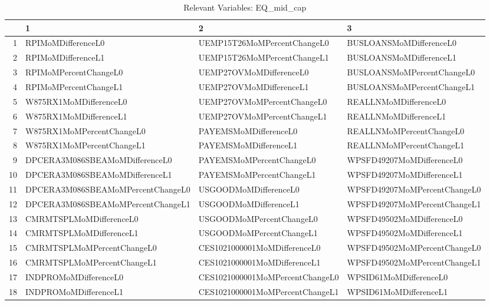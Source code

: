 \begin{longtable}{rlll}
\caption{Relevant Variables: EQ_mid_cap} \\ 
  \hline
 & 1 & 2 & 3 \\ 
  \hline
1 & RPIMoMDifferenceL0 & UEMP15T26MoMPercentChangeL0 & BUSLOANSMoMDifferenceL0 \\ 
  2 & RPIMoMDifferenceL1 & UEMP15T26MoMPercentChangeL1 & BUSLOANSMoMDifferenceL1 \\ 
  3 & RPIMoMPercentChangeL0 & UEMP27OVMoMDifferenceL0 & BUSLOANSMoMPercentChangeL0 \\ 
  4 & RPIMoMPercentChangeL1 & UEMP27OVMoMDifferenceL1 & BUSLOANSMoMPercentChangeL1 \\ 
  5 & W875RX1MoMDifferenceL0 & UEMP27OVMoMPercentChangeL0 & REALLNMoMDifferenceL0 \\ 
  6 & W875RX1MoMDifferenceL1 & UEMP27OVMoMPercentChangeL1 & REALLNMoMDifferenceL1 \\ 
  7 & W875RX1MoMPercentChangeL0 & PAYEMSMoMDifferenceL0 & REALLNMoMPercentChangeL0 \\ 
  8 & W875RX1MoMPercentChangeL1 & PAYEMSMoMDifferenceL1 & REALLNMoMPercentChangeL1 \\ 
  9 & DPCERA3M086SBEAMoMDifferenceL0 & PAYEMSMoMPercentChangeL0 & WPSFD49207MoMDifferenceL0 \\ 
  10 & DPCERA3M086SBEAMoMDifferenceL1 & PAYEMSMoMPercentChangeL1 & WPSFD49207MoMDifferenceL1 \\ 
  11 & DPCERA3M086SBEAMoMPercentChangeL0 & USGOODMoMDifferenceL0 & WPSFD49207MoMPercentChangeL0 \\ 
  12 & DPCERA3M086SBEAMoMPercentChangeL1 & USGOODMoMDifferenceL1 & WPSFD49207MoMPercentChangeL1 \\ 
  13 & CMRMTSPLMoMDifferenceL0 & USGOODMoMPercentChangeL0 & WPSFD49502MoMDifferenceL0 \\ 
  14 & CMRMTSPLMoMDifferenceL1 & USGOODMoMPercentChangeL1 & WPSFD49502MoMDifferenceL1 \\ 
  15 & CMRMTSPLMoMPercentChangeL0 & CES1021000001MoMDifferenceL0 & WPSFD49502MoMPercentChangeL0 \\ 
  16 & CMRMTSPLMoMPercentChangeL1 & CES1021000001MoMDifferenceL1 & WPSFD49502MoMPercentChangeL1 \\ 
  17 & INDPROMoMDifferenceL0 & CES1021000001MoMPercentChangeL0 & WPSID61MoMDifferenceL0 \\ 
  18 & INDPROMoMDifferenceL1 & CES1021000001MoMPercentChangeL1 & WPSID61MoMDifferenceL1 \\ 

\end{longtable}
